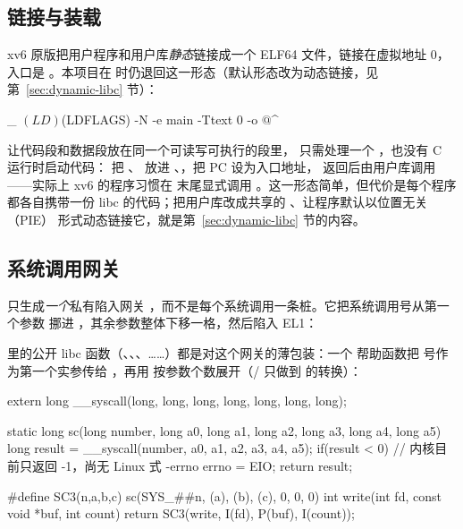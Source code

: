 \subsection{链接与装载}

xv6 原版把用户程序和用户库\emph{静态}链接成一个 ELF64 文件，链接在虚拟地址 0，入口是 。本项目在  时仍退回这一形态（默认形态改为动态链接，见第~\ref{sec:dynamic-libc} 节）：

\begin{makecode}
_%
	$(LD) $(LDFLAGS) -N -e main -Ttext 0 -o $@ $^
\end{makecode}

 让代码段和数据段放在同一个可读写可执行的段里， 只需处理一个 ，也没有 C 运行时启动代码： 把 、 放进 、，把 PC 设为入口地址， 返回后由用户库调用 ——实际上 xv6 的程序习惯在  末尾显式调用 。这一形态简单，但代价是每个程序都各自携带一份 libc 的代码；把用户库改成共享的 、让程序默认以位置无关（PIE） 形式动态链接它，就是第~\ref{sec:dynamic-libc} 节的内容。

\subsection{系统调用网关}

 只生成\emph{一个}私有陷入网关 ，而不是每个系统调用一条桩。它把系统调用号从第一个参数  挪进 ，其余参数整体下移一格，然后陷入 EL1：


 里的公开 libc 函数（、、、……）都是对这个网关的薄包装：一个  帮助函数把  号作为第一个实参传给 ，再用  按参数个数展开（/ 只做到  的转换）：

\begin{ccode}
extern long __syscall(long, long, long, long, long, long, long);

static long sc(long number, long a0, long a1, long a2, long a3, long a4, long a5){
  long result = __syscall(number, a0, a1, a2, a3, a4, a5);
  if(result < 0)                 // 内核目前只返回 -1，尚无 Linux 式 -errno
    errno = EIO;
  return result;
}

#define SC3(n,a,b,c) sc(SYS_##n, (a), (b), (c), 0, 0, 0)
int write(int fd, const void *buf, int count)
{ return SC3(write, I(fd), P(buf), I(count)); }
\end{ccode}

